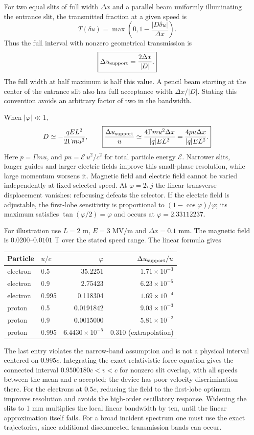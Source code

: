 For two equal slits of full width $\Delta x$ and a parallel beam
uniformly illuminating the entrance slit, the transmitted fraction
at a given speed is
\[
T(\delta u)=\max\left(0,1-\frac{|D\delta u|}{\Delta x}\right).
\]
Thus the full interval with nonzero geometrical transmission is
\[
\boxed{\Delta u_{\rm support}=\frac{2\Delta x}{|D|}.}
\]
The full width at half maximum is half this value.  A pencil beam
starting at the center of the entrance slit also has full acceptance
width $\Delta x/|D|$.  Stating this convention avoids an arbitrary
factor of two in the bandwidth.

When $|\varphi|\ll1$,
\[
D\simeq-\frac{qEL^2}{2\Gamma m u^3},\qquad
\boxed{\frac{\Delta u_{\rm support}}u
 \simeq\frac{4\Gamma m u^2\Delta x}{|q|EL^2}
 =\frac{4pu\Delta x}{|q|EL^2}.}
\]
Here $p=\Gamma mu$, and $pu=\mathcal E\,u^2/c^2$ for total
particle energy $\mathcal E$.  Narrower slits, longer guides and
larger electric fields improve this small-phase resolution, while
large momentum worsens it.  Magnetic field and electric field
cannot be varied independently at fixed selected speed.
At $\varphi=2\pi j$ the linear transverse displacement vanishes:
refocusing defeats the selector.  If the electric field is adjustable,
the first-lobe sensitivity is proportional to
$(1-\cos\varphi)/\varphi$; its maximum satisfies
$\tan(\varphi/2)=\varphi$ and occurs at $\varphi=2.33112237$.

For illustration use $L=2$ m, $E=3$ MV/m and $\Delta x=0.1$ mm.
The magnetic field is $0.0200$--$0.0101$ T over the stated speed
range.  The linear formula gives
\begin{center}
\begin{tabular}{llrr}
\toprule
Particle&$u/c$&$\varphi$&$\Delta u_{\rm support}/u$\\
\midrule
electron&0.5&35.2251&$1.71\times10^{-3}$\\
electron&0.9&2.75423&$6.23\times10^{-5}$\\
electron&0.995&0.118304&$1.69\times10^{-4}$\\
proton&0.5&0.0191842&$9.03\times10^{-3}$\\
proton&0.9&0.0015000&$5.81\times10^{-2}$\\
proton&0.995&$6.4430\times10^{-5}$&$0.310$ (extrapolation)\\
\bottomrule
\end{tabular}
\end{center}
The last entry violates the narrow-band assumption and is not a
physical interval centered on $0.995c$.  Integrating the exact
relativistic force equation gives the connected interval $0.9500180c<v<c$ for nonzero slit
overlap, with all speeds between the mean and
$c$ accepted; the device has poor velocity discrimination there.
For the electrons at $0.5c$, reducing the field to the first-lobe
optimum improves resolution and avoids the high-order oscillatory
response.  Widening the slits to 1 mm multiplies the local linear
bandwidth by ten, until the linear approximation itself fails.
For a broad incident spectrum one must use the exact trajectories,
since additional disconnected transmission bands can occur.

